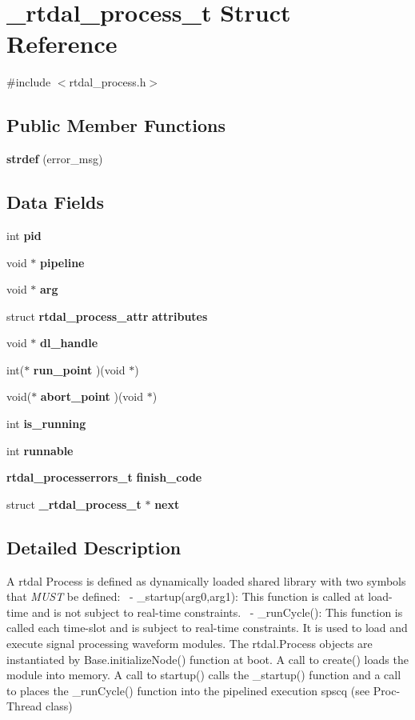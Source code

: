 \section{\-\_\-rtdal\-\_\-process\-\_\-t Struct Reference}
\label{struct__rtdal__process__t}


{\ttfamily \#include $<$rtdal\-\_\-process.\-h$>$}

\subsection*{Public Member Functions}
\begin{DoxyCompactItemize}
\item 
{\bf strdef} (error\-\_\-msg)
\end{DoxyCompactItemize}
\subsection*{Data Fields}
\begin{DoxyCompactItemize}
\item 
int {\bf pid}
\item 
void $\ast$ {\bf pipeline}
\item 
void $\ast$ {\bf arg}
\item 
struct {\bf rtdal\-\_\-process\-\_\-attr} {\bf attributes}
\item 
void $\ast$ {\bf dl\-\_\-handle}
\item 
int($\ast$ {\bf run\-\_\-point} )(void $\ast$)
\item 
void($\ast$ {\bf abort\-\_\-point} )(void $\ast$)
\item 
int {\bf is\-\_\-running}
\item 
int {\bf runnable}
\item 
{\bf rtdal\-\_\-processerrors\-\_\-t} {\bf finish\-\_\-code}
\item 
struct {\bf \-\_\-rtdal\-\_\-process\-\_\-t} $\ast$ {\bf next}
\end{DoxyCompactItemize}


\subsection{Detailed Description}
A rtdal Process is defined as dynamically loaded shared library with two symbols that {\itshape M\-U\-S\-T} be defined\-:  -\/ \-\_\-startup(arg0,arg1)\-: This function is called at load-\/time and is not subject to real-\/time constraints.  -\/ \-\_\-run\-Cycle()\-: This function is called each time-\/slot and is subject to real-\/time constraints. It is used to load and execute signal processing waveform modules. The rtdal.\-Process objects are instantiated by Base.\-initialize\-Node() function at boot. A call to create() loads the module into memory. A call to startup() calls the \-\_\-startup() function and a call to places the \-\_\-run\-Cycle() function into the pipelined execution spscq (see Proc-\/\-Thread class) 

